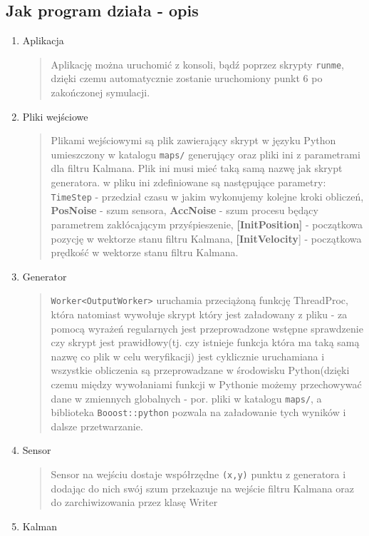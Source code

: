 \documentclass{article}
\begin{document}
	\subsection{Jak program działa - opis}
	\begin{enumerate}
		\item Aplikacja
		\begin{verse} 
			Aplikację można uruchomić z konsoli, bądź poprzez skrypty \texttt{runme}, dzięki czemu automatycznie zostanie uruchomiony punkt 6 po zakończonej symulacji.
		\end{verse}
		\item Pliki wejściowe
		\begin{verse}
			Plikami wejściowymi są plik zawierający skrypt w języku Python umieszczony w katalogu \texttt{maps/} generujący oraz pliki ini z parametrami dla filtru Kalmana. Plik ini musi mieć taką samą nazwę jak skrypt generatora. w pliku ini zdefiniowane są następujące parametry: \texttt{TimeStep} - przedział czasu w jakim wykonujemy kolejne kroki obliczeń,    \textbf{PosNoise} - szum sensora, \textbf{AccNoise} - szum procesu będący parametrem zakłócającym przyśpieszenie, \textbf{[InitPosition]} - początkowa pozycję w wektorze stanu filtru Kalmana, \textbf{[InitVelocity}] - początkowa prędkość w wektorze stanu filtru Kalmana. 
		\end{verse}		
		\item Generator
		 \begin{verse}
		 \texttt{Worker<OutputWorker>} uruchamia przeciążoną funkcję ThreadProc, która natomiast wywołuje skrypt który jest załadowany z pliku - za pomocą wyrażeń regularnych jest przeprowadzone wstępne sprawdzenie czy skrypt jest prawidłowy(tj. czy istnieje funkcja która ma taką samą nazwę co plik w celu weryfikacji) jest cyklicznie uruchamiana i wszystkie obliczenia są przeprowadzane w środowisku Python(dzięki czemu między wywołaniami funkcji w Pythonie możemy przechowywać dane w zmiennych globalnych - por. pliki w katalogu \texttt{maps/}, a biblioteka \texttt{Booost::python} pozwala na załadowanie tych wyników i dalsze przetwarzanie.
		 \end{verse}
		\item Sensor
		\begin{verse}
		Sensor na wejściu dostaje współrzędne \texttt{(x,y)} punktu z generatora i dodając do nich swój szum przekazuje na wejście filtru Kalmana oraz do zarchiwizowania przez klasę Writer
		\end{verse}
		\item Kalman

\end{enumerate}
\end{document}
